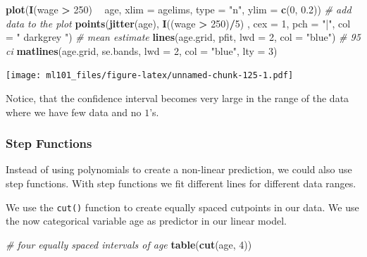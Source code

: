 \documentclass[]{article}
\newenvironment{Shaded}{\begin{snugshade}}{\end{snugshade}}
\newcommand{\CommentTok}[1]{\textcolor[rgb]{0.56,0.35,0.01}{\textit{#1}}}
\newcommand{\DataTypeTok}[1]{\textcolor[rgb]{0.13,0.29,0.53}{#1}}
\newcommand{\DecValTok}[1]{\textcolor[rgb]{0.00,0.00,0.81}{#1}}
\newcommand{\FloatTok}[1]{\textcolor[rgb]{0.00,0.00,0.81}{#1}}
\newcommand{\KeywordTok}[1]{\textcolor[rgb]{0.13,0.29,0.53}{\textbf{#1}}}
\newcommand{\NormalTok}[1]{#1}
\newcommand{\OperatorTok}[1]{\textcolor[rgb]{0.81,0.36,0.00}{\textbf{#1}}}
\newcommand{\StringTok}[1]{\textcolor[rgb]{0.31,0.60,0.02}{#1}}
\begin{document}
\begin{Shaded}
\begin{Highlighting}[]
\KeywordTok{plot}\NormalTok{(}\KeywordTok{I}\NormalTok{(wage }\OperatorTok{>}\StringTok{ }\DecValTok{250}\NormalTok{) }\OperatorTok{~}\StringTok{ }\NormalTok{age, }\DataTypeTok{xlim =}\NormalTok{ agelims, }\DataTypeTok{type =} \StringTok{"n"}\NormalTok{, }\DataTypeTok{ylim =} \KeywordTok{c}\NormalTok{(}\DecValTok{0}\NormalTok{, }\FloatTok{0.2}\NormalTok{))}
\CommentTok{# add data to the plot}
\KeywordTok{points}\NormalTok{(}\KeywordTok{jitter}\NormalTok{(age), }\KeywordTok{I}\NormalTok{((wage }\OperatorTok{>}\StringTok{ }\DecValTok{250}\NormalTok{)}\OperatorTok{/}\DecValTok{5}\NormalTok{) , }\DataTypeTok{cex =} \DecValTok{1}\NormalTok{, }\DataTypeTok{pch =} \StringTok{"|"}\NormalTok{, }\DataTypeTok{col =} \StringTok{" darkgrey "}\NormalTok{)}
\CommentTok{# mean estimate}
\KeywordTok{lines}\NormalTok{(age.grid, pfit, }\DataTypeTok{lwd =} \DecValTok{2}\NormalTok{, }\DataTypeTok{col =} \StringTok{"blue"}\NormalTok{)}
\CommentTok{# 95 ci}
\KeywordTok{matlines}\NormalTok{(age.grid, se.bands, }\DataTypeTok{lwd =} \DecValTok{2}\NormalTok{, }\DataTypeTok{col =} \StringTok{"blue"}\NormalTok{, }\DataTypeTok{lty =} \DecValTok{3}\NormalTok{)}
\end{Highlighting}
\end{Shaded}

\texttt{[image: ml101\_files/figure-latex/unnamed-chunk-125-1.pdf]}

Notice, that the confidence interval becomes very large in the range of the data where we have few data and no \(1\)'s.

\hypertarget{step-functions}{%
\subsubsection{Step Functions}\label{step-functions}}

Instead of using polynomials to create a non-linear prediction, we could also use step functions. With step functions we fit different lines for different data ranges.

We use the \texttt{cut()} function to create equally spaced cutpoints in our data. We use the now categorical variable age as predictor in our linear model.

\begin{Shaded}
\begin{Highlighting}[]
\CommentTok{# four equally spaced intervals of age}
\KeywordTok{table}\NormalTok{(}\KeywordTok{cut}\NormalTok{(age, }\DecValTok{4}\NormalTok{))}
\end{Highlighting}
\end{Shaded}
\end{document}
